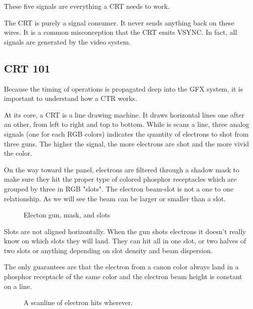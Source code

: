 These five signals are everything a CRT needs to work. 

\begin{trivia} The CRT is purely a signal consumer. It never sends anything back on these wires. It is a common misconception that the CRT emits VSYNC. In fact, all signals are generated by the video system.
\end{trivia}


\subsection{CRT 101}

Because the timing of operations is propagated deep into the GFX system, it is important to understand how a CTR works.

At its core, a CRT is a line drawing machine. It draws horizontal lines one after an other, from left to right and top to bottom. While is scans a line, three analog signals (one for each RGB colors) indicates the quantity of electrons to shot from three guns. The higher the signal, the more electrons are shot and the more vivid the color.


On the way toward the panel, electrons are filtered through a shadow mask to make sure they hit the proper type of colored phosphor receptacles which are grouped by three in RGB "slots". The electron beam-slot is not a one to one relationship. As we will see the beam can be larger or smaller than a slot.





\begin{figure}[H]
\caption*{Electon gun, mask, and slots}
\end{figure}

Slots are not aligned horizontally. When the gun shots electrons it doesn't really know on which slots they will land. They can hit all in one slot, or two halves of two slots or anything depending on slot density and beam dispersion. 

The only guarantees are that the electron from a canon color always land in a phosphor receptacle of the same color and the electron beam height is constant on a line.

\begin{figure}[H]
\caption*{A scanline of electron hits wherever.}
\end{figure}

